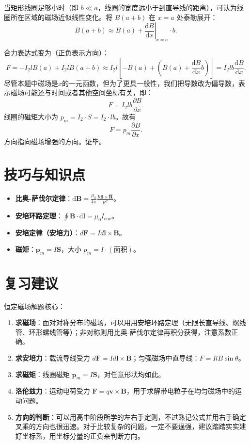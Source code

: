 \documentclass[11pt,a4paper]{ctexart}
\newcommand{\dd}{\mathrm{d}}
\begin{document}
当矩形线圈足够小时（即 $b \ll a$，线圈的宽度远小于到直导线的距离），可认为线圈所在区域的磁场近似线性变化。将 $B(a+b)$ 在 $x=a$ 处泰勒展开：
\[
B(a+b) \approx B(a) + \left.\frac{\dd B}{\dd x}\right|_{x=a} \cdot b.
\]

合力表达式变为（正负表示方向）：
\[
F = - I_2 l B(a)  + I_2 l B(a+b) \approx I_2 l \left[ - B(a) + \left( B(a) + \frac{\dd B}{\dd x} b \right) \right] = I_2 l b \frac{\dd B}{\dd x}.
\]
尽管本题中磁场是$x$的一元函数，但为了更具一般性，我们把导数改为偏导数，表示磁场可能还与时间或者其他空间坐标有关，即：
\[
F = I_2 l b\frac{\partial B}{\partial x}.
\]
线圈的磁矩大小为 $p_m = I_2 \cdot S = I_2 \cdot l b$。故有
\[
F = p_m \frac{\partial B}{\partial x}.
\]
方向指向磁场增强的方向。证毕。

\section*{技巧与知识点}
\begin{tipBox}
\begin{itemize}
  \item \textbf{比奥-萨伐尔定律}：\(\displaystyle \dd\boldsymbol{B} = \frac{\mu_0}{4\pi} \frac{I\dd\boldsymbol{l} \times \hat{\boldsymbol{R}}}{R^2}\)。
  \item \textbf{安培环路定理}：\(\displaystyle \oint \boldsymbol{B} \cdot \dd\boldsymbol{l} = \mu_0 I_{\text{enc}}\)。
  \item \textbf{安培定律（安培力）}：\(d \boldsymbol{F}=I d \boldsymbol{l}\times\boldsymbol{B}\)。
  \item \textbf{磁矩}：\(\displaystyle \boldsymbol{p}_m = I \boldsymbol{S}\)，大小 \(p_m = I \cdot (\text{面积})\)。
\end{itemize}
\end{tipBox}

\section*{复习建议}
\begin{tipBox}
恒定磁场解题核心：
\begin{enumerate}
  \item \textbf{求磁场}：面对对称分布的磁场，可以用用安培环路定理（无限长直导线、螺线管、环形螺线管等）；非对称则用比奥-萨伐尔定律再积分获得，注意系数正确。
  \item \textbf{求安培力}：载流导线受力 \( d \boldsymbol{F}=I d \boldsymbol{l}\times\boldsymbol{B}\)；匀强磁场中直导线：\(F=IlB\sin\theta\)。
  \item \textbf{求磁矩}：线圈磁矩 \(\boldsymbol{p}_m=I\boldsymbol{S}\)，对任意形状均如此。
  \item \textbf{洛伦兹力}：运动电荷受力 \(\boldsymbol{F}=q\boldsymbol{v}\times\boldsymbol{B}\)，用于求解带电粒子在均匀磁场中的运动问题。
  \item \textbf{方向的判断}：可以用高中阶段所学的左右手定则，不过熟记公式并用右手确定叉乘的方向也很迅速。对于比较复杂的问题，一定不要逞强，建议踏踏实实建好坐标系，用坐标分量的正负来判断方向。
\end{enumerate}
\end{tipBox}
\end{document}
